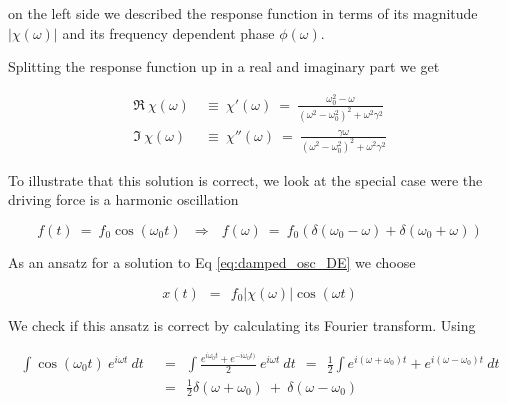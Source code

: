 \documentclass[10pt]{report}
\numberwithin{equation}{chapter}
\newcommand{\refEq}[1]{
  Eq  \ref{#1}
}
\begin{document}
on the left side we described the response function in terms of its magnitude $|\chi(\omega)|$ and its frequency dependent phase $\phi(\omega)$.



Splitting the response function up in a real and imaginary part we get

\begin{align}
  \Re\ \chi(\omega) ~& \equiv~ \chi'(\omega) ~=~ \frac{\omega^2_0 - \omega}{(\omega^2-\omega^2_0)^2 + \omega^2 \gamma^2} \\
  \Im\ \chi(\omega) ~& \equiv~ \chi''(\omega) ~=~ \frac{\gamma \omega}{(\omega^2 - \omega^2_0)^2 + \omega^2 \gamma^2}
\end{align}



To illustrate that this solution is correct, we look at the special case were the driving force is a harmonic oscillation

\begin{equation}
  f(t) ~=~ f_0 \cos(\omega_0 t) ~~~\Rightarrow~~~ f(\omega) 
  ~=~ f_0 \left( \delta(\omega_0 - \omega) + \delta(\omega_0 + \omega) \right)
\end{equation}


As an ansatz for a solution to \refEq{eq:damped_osc_DE} we choose

\begin{equation}
  x(t) ~~=~~ f_0 | \chi(\omega) | \cos(\omega t)
\end{equation}


We check if this ansatz is correct by calculating its Fourier transform. Using



\begin{align}
  \int \cos(\omega_0 t)\ e^{i\omega t}\ dt 
  ~~& =~~ \int \frac{e^{i\omega_0 t} + e^{-i\omega_0 t)}}{2}\ e^{i\omega t}\ dt
  ~~=~~ \frac{1}{2} \int e^{i(\omega + \omega_0)t} + e^{i(\omega - \omega_0)t}\ dt\nonumber \\
  ~~& =~~ \frac{1}{2} \delta(\omega + \omega_0) ~+~ \delta(\omega - \omega_0)
\end{align}
\end{document}
